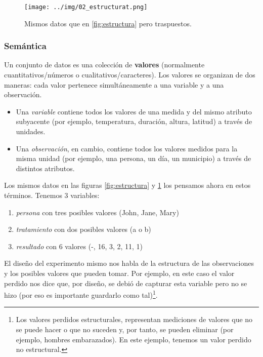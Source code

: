 \documentclass[]{article}
\providecommand{\tightlist}{%
  \setlength{\itemsep}{0pt}\setlength{\parskip}{0pt}}
\let\rmarkdownfootnote\footnote%
\def\footnote{\protect\rmarkdownfootnote}
\begin{document}
\begin{figure}[h]
    \centering
    \texttt{[image: ../img/02\_estructurat.png]}
    \caption{Mismos datos que en \ref{fig:estructura} pero traspuestos.}
    \label{fig:estructurat}
\end{figure}

\subsubsection{Semántica}\label{semantica}

Un conjunto de datos es una colección de \textbf{valores} (normalmente
cuantitativos/números o cualitativos/caracteres). Los valores se
organizan de dos maneras: cada valor pertenece simultáneamente a una
variable y a una observación.

\begin{itemize}
\tightlist
\item
  Una \emph{variable} contiene todos los valores de una medida y del
  mismo atributo subyacente (por ejemplo, temperatura, duración, altura,
  latitud) a través de unidades.
\item
  Una \emph{observación}, en cambio, contiene todos los valores medidos
  para la misma unidad (por ejemplo, una persona, un día, un municipio)
  a través de distintos atributos.
\end{itemize}

Los mismos datos en las figuras \ref{fig:estructura} y
\ref{fig:estructurat} los pensamos ahora en estos términos. Tenemos 3
variables:

\begin{enumerate}
\def\labelenumi{\arabic{enumi}.}
\tightlist
\item
  \emph{persona} con tres posibles valores (John, Jane, Mary)
\item
  \emph{tratamiento} con dos posibles valores (a o b)
\item
  \emph{resultado} con 6 valores (-, 16, 3, 2, 11, 1)
\end{enumerate}

El diseño del experimento mismo nos habla de la estructura de las
observaciones y los posibles valores que pueden tomar. Por ejemplo, en
este caso el valor perdido nos dice que, por diseño, se debió de
capturar esta variable pero no se hizo (por eso es importante guardarlo
como tal)\footnote{Los valores perdidos estructurales, representan
  mediciones de valores que no se puede hacer o que no suceden y, por
  tanto, se pueden eliminar (por ejemplo, hombres embarazados). En este
  ejemplo, tenemos un valor perdido no estructural.}.
\end{document}
